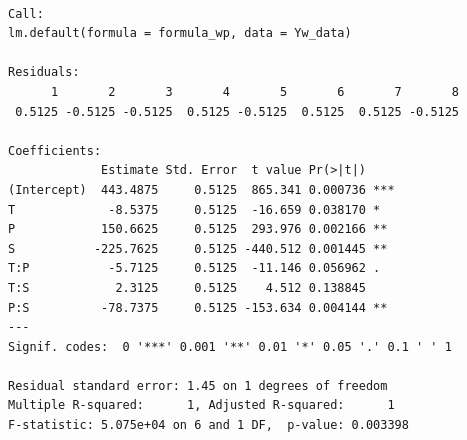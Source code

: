 \documentclass[
  letterpaper,
  DIV=11,
  numbers=noendperiod]{scrartcl}
\begin{document}
\begin{verbatim}

Call:
lm.default(formula = formula_wp, data = Yw_data)

Residuals:
      1       2       3       4       5       6       7       8 
 0.5125 -0.5125 -0.5125  0.5125 -0.5125  0.5125  0.5125 -0.5125 

Coefficients:
             Estimate Std. Error  t value Pr(>|t|)    
(Intercept)  443.4875     0.5125  865.341 0.000736 ***
T             -8.5375     0.5125  -16.659 0.038170 *  
P            150.6625     0.5125  293.976 0.002166 ** 
S           -225.7625     0.5125 -440.512 0.001445 ** 
T:P           -5.7125     0.5125  -11.146 0.056962 .  
T:S            2.3125     0.5125    4.512 0.138845    
P:S          -78.7375     0.5125 -153.634 0.004144 ** 
---
Signif. codes:  0 '***' 0.001 '**' 0.01 '*' 0.05 '.' 0.1 ' ' 1

Residual standard error: 1.45 on 1 degrees of freedom
Multiple R-squared:      1, Adjusted R-squared:      1 
F-statistic: 5.075e+04 on 6 and 1 DF,  p-value: 0.003398
\end{verbatim}
\end{document}
